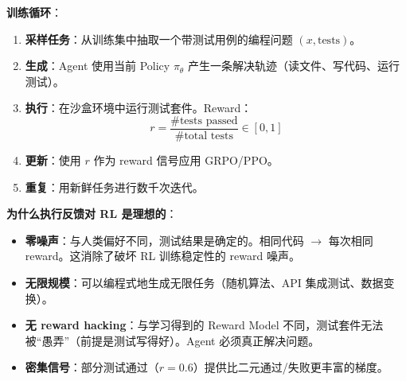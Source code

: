 \textbf{训练循环}：

\begin{enumerate}
  \item \textbf{采样任务}：从训练集中抽取一个带测试用例的编程问题 $(x, \text{tests})$。
  \item \textbf{生成}：Agent 使用当前 Policy $\pi_\theta$ 产生一条解决轨迹（读文件、写代码、运行测试）。
  \item \textbf{执行}：在沙盒环境中运行测试套件。Reward：
\begin{equation}
r = \frac{\text{\# tests passed}}{\text{\# total tests}} \in [0, 1]
\end{equation}
  \item \textbf{更新}：使用 $r$ 作为 reward 信号应用 GRPO/PPO。
  \item \textbf{重复}：用新鲜任务进行数千次迭代。
\end{enumerate}

\textbf{为什么执行反馈对 RL 是理想的}：

\begin{itemize}
  \item \textbf{零噪声}：与人类偏好不同，测试结果是确定的。相同代码 $\rightarrow$ 每次相同 reward。这消除了破坏 RL 训练稳定性的 reward 噪声。
  \item \textbf{无限规模}：可以编程式地生成无限任务（随机算法、API 集成测试、数据变换）。
  \item \textbf{无 reward hacking}：与学习得到的 Reward Model 不同，测试套件无法被``愚弄''（前提是测试写得好）。Agent 必须真正解决问题。
  \item \textbf{密集信号}：部分测试通过（$r = 0.6$）提供比二元通过/失败更丰富的梯度。
\end{itemize}

